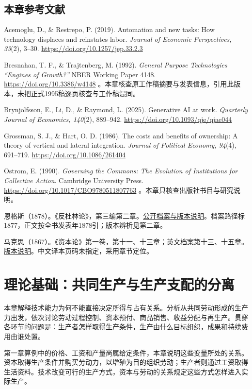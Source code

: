 \documentclass[UTF8,fontset=windows,12pt,a4paper,oneside,openany]{ctexbook}
\begin{document}
\section*{本章参考文献}

Acemoglu, D., \& Restrepo, P. (2019). Automation and new tasks: How technology displaces and reinstates labor. \emph{Journal of Economic Perspectives, 33}(2), 3–30. \url{https://doi.org/10.1257/jep.33.2.3}

Bresnahan, T. F., \& Trajtenberg, M. (1992). \emph{General Purpose Technologies “Engines of Growth?”} NBER Working Paper 4148. \url{https://doi.org/10.3386/w4148} 。本章核查原工作稿摘要与发表信息，引用此版本，未把正式1995稿逐页核查与工作稿混同。

Brynjolfsson, E., Li, D., \& Raymond, L. (2025). Generative AI at work. \emph{Quarterly Journal of Economics, 140}(2), 889–942. \url{https://doi.org/10.1093/qje/qjae044}

Grossman, S. J., \& Hart, O. D. (1986). The costs and benefits of ownership: A theory of vertical and lateral integration. \emph{Journal of Political Economy, 94}(4), 691–719. \url{https://doi.org/10.1086/261404}

Ostrom, E. (1990). \emph{Governing the Commons: The Evolution of Institutions for Collective Action}. Cambridge University Press. \url{https://doi.org/10.1017/CBO9780511807763} 。本章只核查出版社书目与研究说明。

恩格斯（1878）。《反杜林论》，第三编第二章。\href{https://www.marxists.org/archive/marx/works/1877/anti-duhring/index.htm}{公开档案与版本说明}。档案路径标1877，正文按全书发表年1878引；版本辨析见第二章。

马克思（1867）。《资本论》第一卷，第十一、十三章；英文档案第十三、十五章。\href{https://www.marxists.org/archive/marx/works/1867-c1/index.htm}{版本说明}。中文译本页码未指定，采用章节定位。

\chapter{理论基础：共同生产与生产支配的分离}\label{ch:2}

本章解释技术能力为何不能直接决定所得与占有关系。分析从共同劳动形成的生产力出发，依次讨论劳动过程控制、资本预付、商品销售、收益分配与再生产。贯穿各环节的问题是：生产者怎样取得生产条件，生产由什么目标组织，成果和持续费用由谁处置。



第一章算例中的价格、工资和产量尚属给定条件，本章说明这些变量所处的关系。资本取得生产条件并购买劳动力，以增殖为目的组织劳动；生产者则通过工资取得生活资料。技术改变可行的生产方式，资本与劳动的关系规定这些方式怎样进入实际生产。
\end{document}
